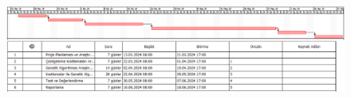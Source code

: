 \documentclass[12pt, a4paper]{article}
\begin{document}
	 \newpage
	\begin{landscape}
	\begin{figure}
		\centering
		\includegraphics[width=1.5\textwidth]{GantChart.png}
	\end{figure}
    \end{landscape}
	
\end{document}
